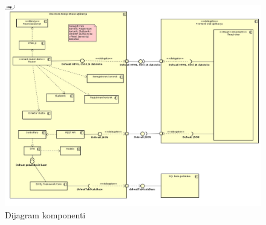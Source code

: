 			\eject

			\begin{figure}
				\centering
				\includegraphics[width=1.0\linewidth]{slike/ComponentDiagram.jpg}
				\caption{Dijagram komponenti}
				\label{fig:ComponentDiagram}
			\end{figure}

			\clearpage
			\eject